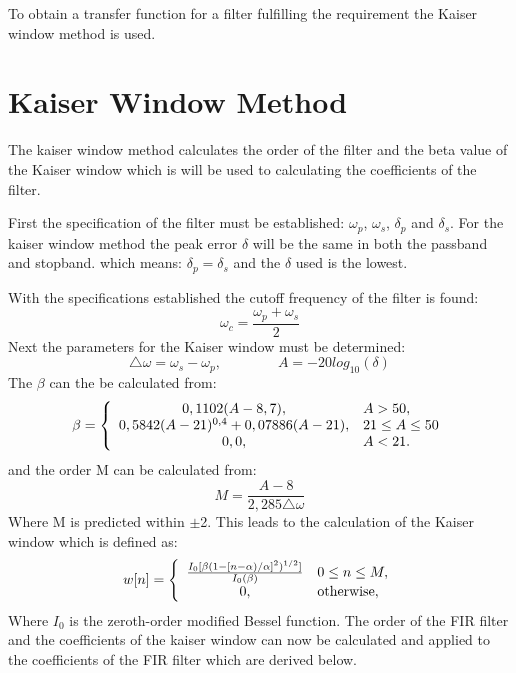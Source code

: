 To obtain a transfer function for a filter fulfilling the requirement the Kaiser window method is used.

\section{Kaiser Window Method}
The kaiser window method calculates the order of the filter and the beta value of the Kaiser window which is will be used to calculating the coefficients of the filter.

First the specification of the filter must be established: $\omega_p$, $\omega_s$, $\delta_p$ and $\delta_s$. For the kaiser window method the peak error $\delta$ will be the same in both the passband and stopband. which means: $\delta_p = \delta_s$ and the $\delta$ used is the lowest.

With the specifications established the cutoff frequency of the filter is found:
\begin{equation}
\omega_c=\frac{\omega_p+\omega_s}{2}
\end{equation}
Next the parameters for the Kaiser window must be determined:
\begin{equation}
\triangle\omega = \omega_s-\omega_p, \qquad\qquad A=-20log_{10}(\delta)
\end{equation}
The $\beta$ can the be calculated from:
\begin{equation} \label{eq:beta}
\beta=\left\{
\begin{array}{c l}      
    0,1102(A-8,7), & A>50,\\
    0,5842(A-21)^{0,4}+0,07886(A-21), & 21\leq A\leq 50\\
    0,0, & A<21.
\end{array}\right.
\end{equation}
and the order M can be calculated from:
\begin{equation}
M=\frac{A-8}{2,285\triangle\omega}
\end{equation}
Where M is predicted within $\pm$2. This leads to the calculation of the Kaiser window which is defined as:
\begin{equation} \label{eq:kaiserwindow}
w[n]=\left\{
\begin{array}{c l}      
    \frac{I_0[\beta(1-[n-\alpha)/\alpha]^2)^{1/2}]}{I_0(\beta)} & 0\leq n\leq M,\\
    0, & \textrm{otherwise},
\end{array}\right.
\end{equation}
Where $I_0$ is the zeroth-order modified Bessel function. The order of the FIR filter and the coefficients of the kaiser window can now be calculated and applied to the coefficients of the FIR filter which are derived below.

